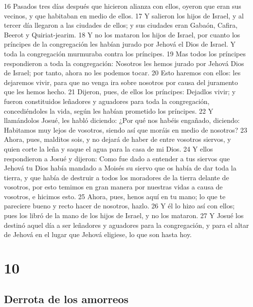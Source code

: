 16 Pasados tres días después que hicieron alianza con ellos, oyeron que eran sus vecinos, y que habitaban en medio de ellos.
17 Y salieron los hijos de Israel, y al tercer día llegaron a las ciudades de ellos; y sus ciudades eran Gabaón, Cafira, Beerot y Quiriat-jearim.
18 Y no los mataron los hijos de Israel, por cuanto los príncipes de la congregación les habían jurado por Jehová el Dios de Israel. Y toda la congregación murmuraba contra los príncipes.
19 Mas todos los príncipes respondieron a toda la congregación: Nosotros les hemos jurado por Jehová Dios de Israel; por tanto, ahora no les podemos tocar.
20 Esto haremos con ellos: les dejaremos vivir, para que no venga ira sobre nosotros por causa del juramento que les hemos hecho.
21 Dijeron, pues, de ellos los príncipes: Dejadlos vivir; y fueron constituidos leñadores y aguadores para toda la congregación, concediéndoles la vida, según les habían prometido los príncipes.
22 Y llamándolos Josué, les habló diciendo: ¿Por qué nos habéis engañado, diciendo: Habitamos muy lejos de vosotros, siendo así que moráis en medio de nosotros?
23 Ahora, pues, malditos sois, y no dejará de haber de entre vosotros siervos, y quien corte la leña y saque el agua para la casa de mi Dios.
24 Y ellos respondieron a Josué y dijeron: Como fue dado a entender a tus siervos que Jehová tu Dios había mandado a Moisés su siervo que os había de dar toda la tierra, y que había de destruir a todos los moradores de la tierra delante de vosotros, por esto temimos en gran manera por nuestras vidas a causa de vosotros, e hicimos esto.
25 Ahora, pues, henos aquí en tu mano; lo que te pareciere bueno y recto hacer de nosotros, hazlo.
26 Y él lo hizo así con ellos; pues los libró de la mano de los hijos de Israel, y no los mataron.
27 Y Josué los destinó aquel día a ser leñadores y aguadores para la congregación, y para el altar de Jehová en el lugar que Jehová eligiese, lo que son hasta hoy.

\chapter{10}

\section*{Derrota de los amorreos}



